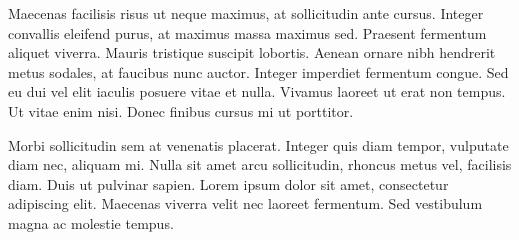 Maecenas facilisis risus ut neque maximus, at sollicitudin ante cursus. Integer convallis eleifend purus, at maximus massa maximus sed. Praesent fermentum aliquet viverra. Mauris tristique suscipit lobortis. Aenean ornare nibh hendrerit metus sodales, at faucibus nunc auctor. Integer imperdiet fermentum congue. Sed eu dui vel elit iaculis posuere vitae et nulla. Vivamus laoreet ut erat non tempus. Ut vitae enim nisi. Donec finibus cursus mi ut porttitor.

Morbi sollicitudin sem at venenatis placerat. Integer quis diam tempor, vulputate diam nec, aliquam mi. Nulla sit amet arcu sollicitudin, rhoncus metus vel, facilisis diam. Duis ut pulvinar sapien. Lorem ipsum dolor sit amet, consectetur adipiscing elit. Maecenas viverra velit nec laoreet fermentum. Sed vestibulum magna ac molestie tempus. 